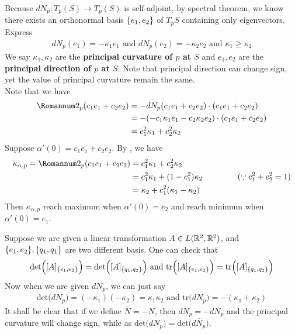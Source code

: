 \documentclass{report}
\begin{document}
\begin{mdframed}
Because $dN_p:T_p(S)\rightarrow T_p(S)$ is self-adjoint, by spectral theorem, we know there exists an orthonormal basis $\{ e_1,e_2 \}$ of $T_pS$ containing only eigenvectors. Express 
\begin{align*}
  dN_p(e_1)=-\kappa_1 e_1\text{ and }dN_p(e_2)=-\kappa _2 e_2\text{ and }\kappa_1 \geq \kappa_2
\end{align*}
We say $\kappa_1,\kappa_2$ are the \textbf{principal curvature of $p$ at  $S$} and $e_1,e_2$ are the  \textbf{principal direction of $p$ at  $S$}. Note that principal direction can change sign, yet the value of principal curvature remain the same.\\

Note that we have  
\begin{align*}
\Sec_p(c_1e_1+c_2e_2)&=-dN_p(c_1e_1+c_2e_2)\cdot (c_1e_1+c_2e_2)\\
&=-(-c_1\kappa_1 e_1-c_2\kappa_2 e_2)\cdot (c_1e_1+c_2e_2)\\
&=c_1^2 \kappa_1 + c_2^2\kappa_2
\end{align*}
Suppose $\alpha '(0)=c_1e_1+c_2e_2$. By , we have
\begin{align*}
\kappa_{\alpha ,p} = \Sec_p(c_1e_1+c_2e_2)&=c_1^2 \kappa_1 +c_2^2 \kappa_2\\
&=c_1^2 \kappa_1 + (1-c_1^2)\kappa_2\hspace{1.5cm}(\because c_1^2+c_2^2=1)\\
&= \kappa_2 + c_1^2 (\kappa_1-\kappa_2)
\end{align*}
Then $\kappa_{\alpha ,p}$ reach maximum when $\alpha '(0)=e_2$ and reach minimum when $\alpha '(0)=e_1$.\\ 
\end{mdframed}
\begin{mdframed}
Suppose we are given a linear transformation $A\in L(\mathbb{R}^2,\mathbb{R}^2)$, and $\{ e_1,e_2 \},\{ q_1,q_1 \}$ are two different basis. One can check that 
\begin{align*}
  \text{det}\Big([A]_{\{ e_1,e_2 \}} \Big)=\text{det}\Big([A]_{\{ q_1,q_2 \}} \Big)\text{ and }\text{tr}\Big([A]_{\{ e_1,e_2 \}} \Big)=\text{tr}\Big([A]_{\{ q_1,q_2 \}} \Big)
\end{align*}
Now when we are given $dN_p$, we can just say 
 \begin{align*}
\text{det}\Big(dN_p \Big)=(-\kappa_1)(-\kappa_2)=\kappa_1\kappa_2\text{ and }\text{tr}\Big(dN_p \Big)=-(\kappa_1+\kappa_2)
\end{align*}
It shall be clear that if we define $\overline{N}=-N$, then $d\overline{N}_p=-dN_p$ and the principal curvature will change sign, while as $\text{det}\Big(dN_p \Big)=\text{det}\Big(d\overline{N}_p \Big)$.\\

\end{mdframed}
\end{document}
